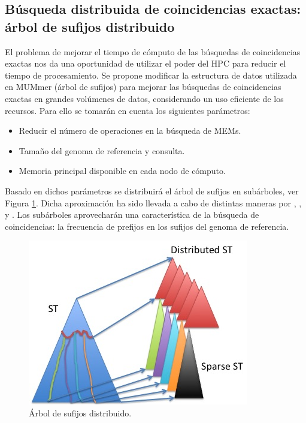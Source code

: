 \documentclass[12pt,a4paper]{article}
\begin{document}
\subsection{Búsqueda distribuida de coincidencias exactas: árbol de sufijos distribuido}
\indent
El problema de mejorar el tiempo de cómputo de las búsquedas de coincidencias 
exactas nos da una oportunidad de utilizar el poder del HPC para reducir el
tiempo de procesamiento. Se propone modificar la estructura de datos utilizada en 
MUMmer (árbol de sufijos) para mejorar las búsquedas de coincidencias exactas en 
grandes volúmenes de datos, considerando un uso eficiente de los recursos. Para 
ello se tomarán en cuenta los siguientes parámetros: 
\begin{itemize}
\item Reducir el número de operaciones en la búsqueda de MEMs.
\item Tamaño del genoma de referencia y consulta.
\item Memoria principal disponible en cada nodo de cómputo.
\end{itemize}
\indent
Basado en dichos parámetros se distribuirá el árbol de sufijos en subárboles, 
ver Figura \ref{fig:estructura}. Dicha aproximación ha sido llevada a cabo de distintas maneras por \cite{Mansour2012}, 
\cite{Japp2004}, \cite{Ghoting2010} y \cite{Sadakane}.
 Los subárboles aprovecharán una característica
de la búsqueda de coincidencias: la frecuencia de prefijos en los sufijos del genoma de referencia.\\ 
\begin{figure}[h]
\begin{center}
\includegraphics[scale=0.8]{distributed.png}
\caption{Árbol de sufijos distribuido.}
\label{fig:estructura}
\end{center}
\end{figure}
\end{document}
